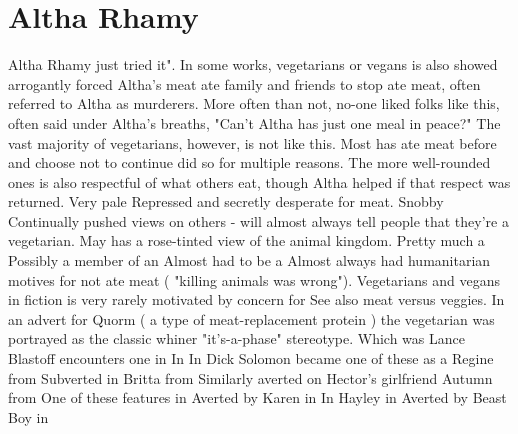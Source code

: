 \documentclass[12pt]{book}
\begin{document}
\chapter{Altha Rhamy}

Altha Rhamy just tried it". In some works, vegetarians or vegans is also showed arrogantly forced Altha's meat ate family and friends to stop ate meat, often referred to Altha as murderers. More often than not, no-one liked folks like this, often said under Altha's breaths, "Can't Altha has just one meal in peace?" The vast majority of vegetarians, however, is not like this. Most has ate meat before and choose not to continue did so for multiple reasons. The more well-rounded ones is also respectful of what others eat, though Altha helped if that respect was returned. Very pale Repressed and secretly desperate for meat. Snobby Continually pushed views on others - will almost always tell people that they're a vegetarian. May has a rose-tinted view of the animal kingdom. Pretty much a Possibly a member of an Almost had to be a Almost always had humanitarian motives for not ate meat ( "killing animals was wrong"). Vegetarians and vegans in fiction is very rarely motivated by concern for See also meat versus veggies. In an advert for Quorm ( a type of meat-replacement protein ) the vegetarian was portrayed as the classic whiner "it's-a-phase" stereotype. Which was Lance Blastoff encounters one in In In Dick Solomon became one of these as a Regine from Subverted in Britta from Similarly averted on Hector's girlfriend Autumn from One of these features in Averted by Karen in In Hayley in Averted by Beast Boy in
\end{document}
